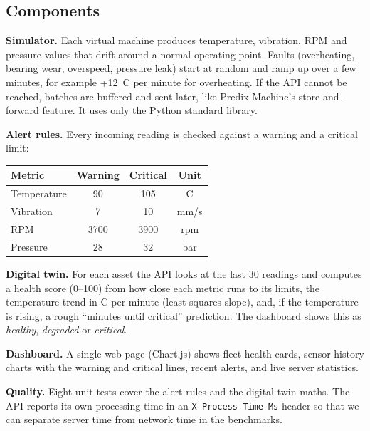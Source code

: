 \documentclass[12pt,a4paper]{article}
\begin{document}
\subsection{Components}
\textbf{Simulator.} Each virtual machine produces temperature, vibration, RPM and pressure values that
drift around a normal operating point. Faults (overheating, bearing wear, overspeed, pressure leak)
start at random and ramp up over a few minutes, for example +12\,\textdegree{} C per minute for overheating.
If the API cannot be reached, batches are buffered and sent later, like Predix Machine's
store-and-forward feature. It uses only the Python standard library.

\textbf{Alert rules.} Every incoming reading is checked against a warning and a critical limit:
\begin{center}
\begin{tabular}{lccc}
\toprule
\textbf{Metric} & \textbf{Warning} & \textbf{Critical} & \textbf{Unit} \\
\midrule
Temperature & 90 & 105 & \textdegree{} C \\
Vibration & 7 & 10 & mm/s \\
RPM & 3700 & 3900 & rpm \\
Pressure & 28 & 32 & bar \\
\bottomrule
\end{tabular}
\end{center}

\textbf{Digital twin.} For each asset the API looks at the last 30 readings and computes a health score
(0--100) from how close each metric runs to its limits, the temperature trend in \textdegree{} C per minute
(least-squares slope), and, if the temperature is rising, a rough ``minutes until critical''
prediction. The dashboard shows this as \emph{healthy}, \emph{degraded} or \emph{critical}.

\textbf{Dashboard.} A single web page (Chart.js) shows fleet health cards, sensor history charts with
the warning and critical lines, recent alerts, and live server statistics.

\textbf{Quality.} Eight unit tests cover the alert rules and the digital-twin maths. The API reports its
own processing time in an \texttt{X-Process-Time-Ms} header so that we can separate server time from
network time in the benchmarks.
\end{document}
